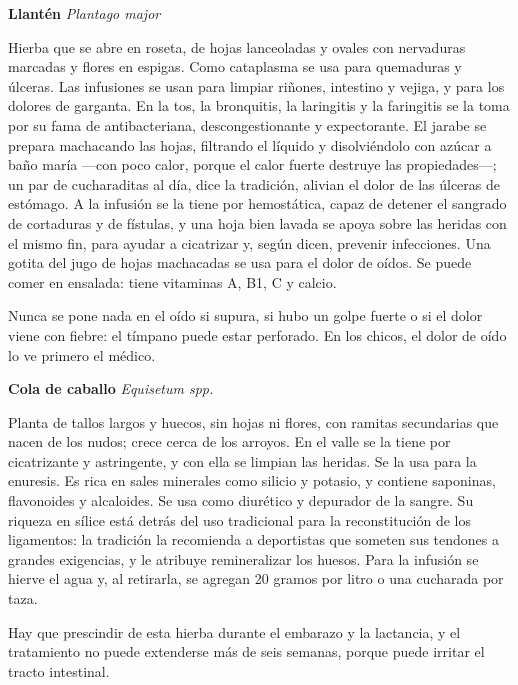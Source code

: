 \documentclass[11pt,twoside,openright]{book}
\newcommand{\necesita}[1]{%
  \par\ifdim\dimexpr\pagegoal-\pagetotal\relax<#1\relax\newpage\fi}
\newenvironment{planta}[3]{%
  \par\necesita{8\baselineskip}\vspace{1.4em}\noindent
  {\sffamily\bfseries\large\color{verdehuerta}#1}\quad
  {\itshape\small\color{gris}#2}\par
  \vspace{0.15em}
  \noindent{\color{verdehoja}\rule{\textwidth}{0.6pt}}\par
  \vspace{0.25em}
  \noindent{\sffamily\scriptsize\color{terracota}\MakeUppercase{Se usa: }#3}\par
  \vspace{0.55em}\small\ignorespaces
}{\par\vspace{0.4em}}
\newcommand{\spp}{\textup{spp.}}
\begin{document}
\begin{planta}{Llantén}{Plantago major}{Hojas}
\label{pl-llanten}%
Hierba que se abre en roseta, de hojas lanceoladas y ovales con
nervaduras marcadas y flores en espigas. Como cataplasma se usa para
quemaduras y úlceras. Las infusiones se usan para limpiar riñones,
intestino y vejiga, y para los dolores de garganta. En la tos, la
bronquitis, la laringitis y la faringitis se la toma por su fama de
antibacteriana, descongestionante y expectorante. El jarabe se prepara machacando las
hojas, filtrando el líquido y disolviéndolo con azúcar a baño maría
—con poco calor, porque el calor fuerte destruye las propiedades—; un
par de cucharaditas al día, dice la tradición, alivian el dolor de las
úlceras de estómago. A la infusión se la tiene por hemostática, capaz de
detener el sangrado de cortaduras y de fístulas, y una hoja bien lavada
se apoya sobre las heridas con el mismo fin, para ayudar a cicatrizar y,
según dicen, prevenir infecciones. Una gotita del jugo de hojas
machacadas se usa para el dolor de oídos. Se puede comer en ensalada: tiene
vitaminas A, B1, C y calcio.
\begin{cuidado}
Nunca se pone nada en el oído si supura, si hubo un golpe fuerte o si
el dolor viene con fiebre: el tímpano puede estar perforado. En los
chicos, el dolor de oído lo ve primero el médico.
\end{cuidado}
\end{planta}

\begin{planta}{Cola de caballo}{Equisetum \spp}{Tallos}
\label{pl-cola}%
Planta de tallos largos y huecos, sin hojas ni flores, con ramitas
secundarias que nacen de los nudos; crece cerca de los arroyos. En el valle
se la tiene por cicatrizante y astringente, y con ella se limpian las
heridas. Se la usa para la enuresis. Es rica en sales minerales como
silicio y potasio, y contiene saponinas, flavonoides y alcaloides. Se
usa como diurético y depurador de la sangre. Su riqueza en sílice está
detrás del uso tradicional para la reconstitución de los ligamentos: la
tradición la recomienda a deportistas que someten sus tendones a grandes
exigencias, y le atribuye remineralizar los huesos. Para la infusión se hierve el agua y, al retirarla, se
agregan 20 gramos por litro o una cucharada por taza.
\begin{cuidado}
Hay que prescindir de esta hierba durante el embarazo y la lactancia, y
el tratamiento no puede extenderse más de seis semanas, porque puede
irritar el tracto intestinal.
\end{cuidado}
\end{planta}
\end{document}
